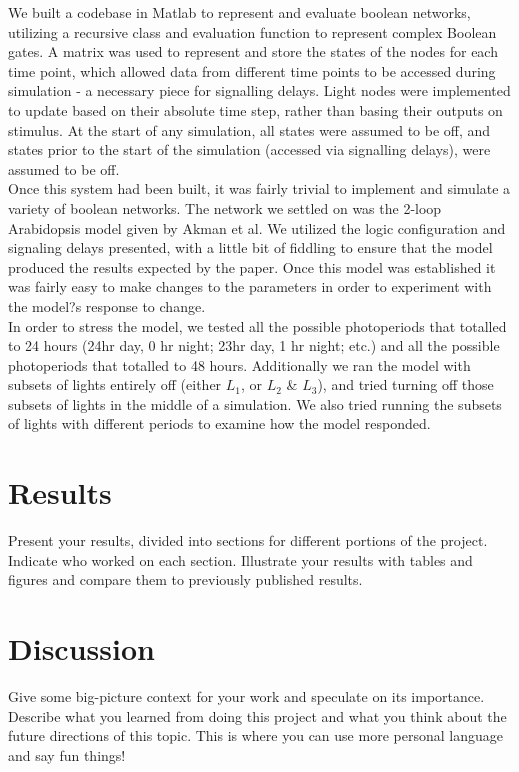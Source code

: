 \documentclass[twoside,twocolumn,9pt]{article}
\begin{document}
We built a codebase in Matlab to represent and evaluate boolean networks, utilizing a recursive class and evaluation function to represent complex Boolean gates. A matrix was used to represent and store the states of the nodes for each time point, which allowed data from different time points to be accessed during simulation - a necessary piece for signalling delays. Light nodes were implemented to update based on their absolute time step, rather than basing their outputs on stimulus. At the start of any simulation, all states were assumed to be off, and states prior to the start of the simulation (accessed via signalling delays), were assumed to be off. \\
Once this system had been built, it was fairly trivial to implement and simulate a variety of boolean networks. The network we settled on was the 2-loop Arabidopsis model given by Akman et al\cite{digiclocks}. We utilized the logic configuration and signaling delays presented, with a little bit of fiddling to ensure that the model produced the results expected by the paper. Once this model was established it was fairly easy to make changes to the parameters in order to experiment with the model?s response to change. \\
In order to stress the model, we tested all the possible photoperiods that totalled to 24 hours (24hr day, 0 hr night; 23hr day, 1 hr night; etc.) and all the possible photoperiods that totalled to 48 hours. Additionally we ran the model with subsets of lights entirely off (either $L_1$, or $L_2$ \& $L_3$), and tried turning off those subsets of lights in the middle of a simulation. We also tried running the subsets of lights with different periods to examine how the model responded.

\section{Results}

Present your results, divided into sections for different portions of the project. Indicate who worked on each section. Illustrate your results with tables and figures and compare them to previously published results.


\section{Discussion}

Give some big-picture context for your work and speculate on its importance. Describe what you learned from doing this project and what you think about the future directions of this topic. This is where you can use more personal language and say fun things!
\end{document}
